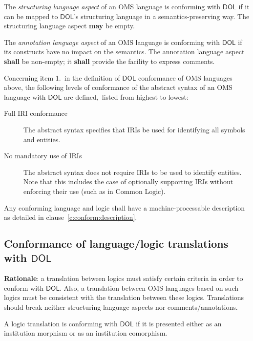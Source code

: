 \documentclass[10pt,fleqn,final]{scrreprt}
\newcommand*{\shall}{\textbf{shall}\xspace}
\newcommand*{\may}{\textbf{may}\xspace}
\newcommand*{\DOL}{\ensuremath{\mathsf{DOL}}\xspace}
\newcommand{\clauserefname}{clause}
\newcommand{\cref}[1]{\clauserefname~\ref{#1}}
\newcommand{\ssclause}[1]{\subsection{#1}}
\begin{document}
The \emph{structuring language aspect} of an OMS language is conforming with \DOL if it can be
mapped to \DOL's structuring language in a semantics-preserving way. The structuring language aspect
\may be empty.

The \emph{annotation language aspect} of an OMS language is conforming with \DOL if its constructs
have no impact on the semantics. The annotation language aspect \shall be non-empty; it \shall
provide the facility to express comments.


Concerning item 1.\ in the definition of \DOL conformance of OMS
languages above, the following levels of conformance of the abstract
syntax of an OMS language with \DOL are defined,\ 
listed from highest to lowest:

\begin{description}
\item[Full IRI conformance] The abstract syntax specifies that IRIs be used for
 identifying all symbols and entities.
\item[No mandatory use of IRIs] The abstract syntax does not require  IRIs
 to be used to identify entities. Note that this includes the case of
  optionally supporting IRIs without enforcing their use (such as in Common
  Logic).
\end{description}

Any conforming language and logic shall have a machine-processable description
 as detailed in \cref{c:conform:description}.

\ssclause{Conformance of language/logic translations with \DOL}\label{c:conform:translation}
\begin{fminipage}{\textwidth}
\textbf{Rationale}: a translation between logics must satisfy certain criteria in order to conform with \DOL.
Also, a translation between OMS languages based on such logics must be consistent with the
translation between these logics.  Translations should break neither structuring language aspects nor comments/annotations.
\end{fminipage}

A logic translation is conforming with \DOL if it is presented either as an institution morphism or
as an institution comorphism.  
\end{document}
